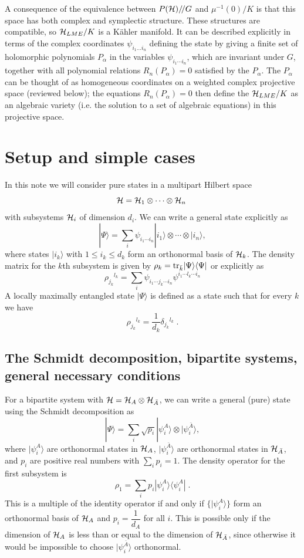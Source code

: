 \documentclass[12pt]{article}
\theoremstyle{definition}
\newcommand{\be}{\begin{equation}}
\newcommand{\ee}{\end{equation}}
\newcommand{\tr}{{\rm tr}}
\newcommand{\GITquot}{/\!/}
\begin{document}
A consequence of the equivalence between $P({\cal H})\GITquot G$ and
$\mu^{-1}(0)/K$ is that this space has both complex and symplectic
structure. These structures are compatible, so ${\cal H}_{LME}/K$ is a
K\"ahler manifold. It can be described explicitly in terms of the
complex coordinates $\psi_{i_1 \dots i_n}$ defining the state by
giving a finite set of holomorphic polynomials $P_{\alpha }$ in the
variables $\psi_{i_{1}\dotsb i_{n}}$, which are invariant under $G$,
together with all polynomial relations $R_n(P_\alpha ) = 0$ satisfied
by the $P_{\alpha }$. The $P_\alpha $ can be thought of as homogeneous
coordinates on a weighted complex projective space (reviewed below); the equations
$R_n(P_\alpha ) = 0$ then define the ${\cal H}_{LME}/K$ as an
algebraic variety (i.e. the solution to a set of algebraic equations)
in this projective space.






\section{Setup and simple cases}

In this note we will consider pure states in a multipart Hilbert space
\[
{\cal H} = {\cal H}_{1} \otimes \cdots \otimes {\cal H}_{n} \;
\]
with subsystems ${\cal H}_i$ of dimension $d_i$. We can write a general state explicitly as
\be
|\Psi \rangle = \sum_i \psi_{i_1 \cdots i_n} |i_1 \rangle \otimes \cdots \otimes |i_n \rangle,
\ee
where states $|i_k \rangle$ with $1 \le i_k \le d_k$ form an orthonormal basis of ${\cal H}_k$. The density matrix for the $k$th subsystem is given by $\rho_k = \tr_{\bar{k}} | \Psi \rangle \langle \Psi |$ or explicitly as
\be
\rho_{j_k} {}^{l_k} = \sum_{i}  \psi_{i_1 \cdots j_k \cdots i_n}\psi^{i_1 \cdots l_k \cdots i_n}
\ee
A locally maximally entangled state $|\Psi \rangle$ is defined as a state such that for every $k$ we have
\be
\rho_{j_k} {}^{l_k} = \frac{1}{d_k} \delta_{j_k} {}^{l_k} \; .
\ee

\subsection{The Schmidt decomposition, bipartite systems, general necessary conditions}

For a bipartite system with ${\cal H} = {\cal H}_A \otimes {\cal H}_{\bar{A}}$, we can write a general (pure) state using the Schmidt decomposition as
\be
|\Psi \rangle = \sum_i \sqrt{p_i} |\psi_i^A \rangle \otimes |\psi_i^{\bar{A}} \rangle,
\ee
where $|\psi_i^A\rangle$ are orthonormal states in ${\cal H}_A$, $|\psi_i^{\bar{A}} \rangle$ are orthonormal states in ${\cal H}_{\bar{A}}$, and $p_i$ are positive real numbers with $\sum_i p_i = 1$. The density operator for the first subsystem is
\be
\rho_1 = \sum_i p_i |\psi_i^A \rangle \langle \psi_i^A| \; .
\ee
This is a multiple of the identity operator if and only if $\{|\psi_i^A \rangle\}$ form an orthonormal basis of ${\cal H}_A$ and $p_i = \dfrac{1}{ d_A}$ for all $i$. This is possible only if the dimension of ${\cal H}_A$ is less than or equal to the dimension of ${\cal H}_{\bar{A}}$, since otherwise it would be impossible to choose $|\psi_i^{\bar{A}} \rangle$ orthonormal.
\end{document}

